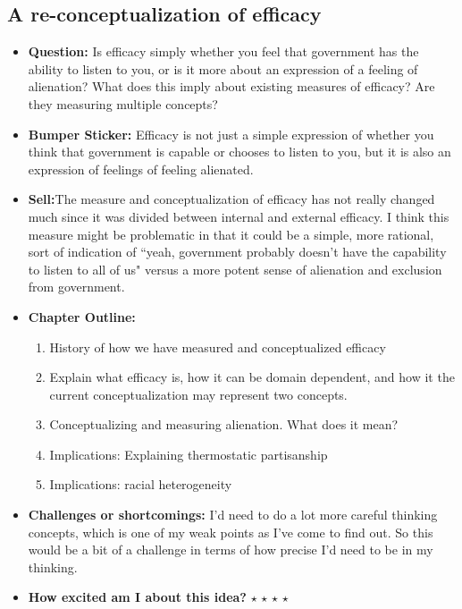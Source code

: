 \documentclass[12pt]{article}
\begin{document}
\subsection{A re-conceptualization of efficacy}
    \begin{itemize}
        \item \textbf{Question:} Is efficacy simply whether you feel that government has the ability to listen to you, or is it more about an expression of a feeling of alienation? What does this imply about existing measures of efficacy? Are they measuring multiple concepts?
        \item \textbf{Bumper Sticker:} Efficacy is not just a simple expression of whether you think that government is capable or chooses to listen to you, but it is also an expression of feelings of feeling alienated.
        \item \textbf{Sell:}The measure and conceptualization of efficacy has not really changed much since it was divided between internal and external efficacy. I think this measure might be problematic in that it could be a simple, more rational, sort of indication of ``yeah, government probably doesn't have the capability to listen to all of us" versus a more potent sense of alienation and exclusion from government.
        \item \textbf{Chapter Outline:}
        \begin{enumerate}
            \item History of how we have measured and conceptualized efficacy
            \item Explain what efficacy is, how it can be domain dependent, and how it the current conceptualization may represent two concepts.
            \item Conceptualizing and measuring alienation. What does it mean?
            \item Implications: Explaining thermostatic partisanship
            \item Implications: racial heterogeneity
        \end{enumerate}
        \item \textbf{Challenges or shortcomings:} I'd need to do a lot more careful thinking concepts, which is one of my weak points as I've come to find out. So this would be a bit of a challenge in terms of how precise I'd need to be in my thinking.
        \item \textbf{How excited am I about this idea?} $\star$ $\star$ $\star$ $\star$
    \end{itemize}
\end{document}
